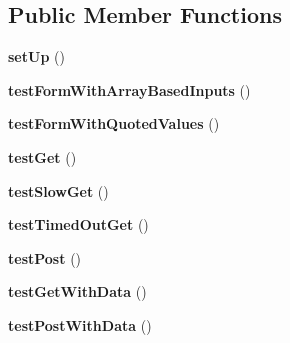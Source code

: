 \subsection*{Public Member Functions}
\begin{DoxyCompactItemize}
\item 
\hypertarget{class_test_of_live_fetching_aea37b08fe496529c1db03622c24cfdb4}{
{\bfseries setUp} ()}
\label{class_test_of_live_fetching_aea37b08fe496529c1db03622c24cfdb4}

\item 
\hypertarget{class_test_of_live_fetching_a76d58f8b72db161a13a95e858065fc12}{
{\bfseries testFormWithArrayBasedInputs} ()}
\label{class_test_of_live_fetching_a76d58f8b72db161a13a95e858065fc12}

\item 
\hypertarget{class_test_of_live_fetching_a29b94465603260d7ff08a0f5ea71df07}{
{\bfseries testFormWithQuotedValues} ()}
\label{class_test_of_live_fetching_a29b94465603260d7ff08a0f5ea71df07}

\item 
\hypertarget{class_test_of_live_fetching_a64c286cacc08fb3e195d8d36f9649076}{
{\bfseries testGet} ()}
\label{class_test_of_live_fetching_a64c286cacc08fb3e195d8d36f9649076}

\item 
\hypertarget{class_test_of_live_fetching_a7463d9bb60ec24f84ebe6e9c8b4810c6}{
{\bfseries testSlowGet} ()}
\label{class_test_of_live_fetching_a7463d9bb60ec24f84ebe6e9c8b4810c6}

\item 
\hypertarget{class_test_of_live_fetching_a30c1e1b6f6f504d4aea35b87a2093593}{
{\bfseries testTimedOutGet} ()}
\label{class_test_of_live_fetching_a30c1e1b6f6f504d4aea35b87a2093593}

\item 
\hypertarget{class_test_of_live_fetching_a813d607ce89a14f494105c0a53e3e580}{
{\bfseries testPost} ()}
\label{class_test_of_live_fetching_a813d607ce89a14f494105c0a53e3e580}

\item 
\hypertarget{class_test_of_live_fetching_a5518bfeeca35e41bfcfa984abff339f1}{
{\bfseries testGetWithData} ()}
\label{class_test_of_live_fetching_a5518bfeeca35e41bfcfa984abff339f1}

\item 
\hypertarget{class_test_of_live_fetching_a8f45f15ce72cd4ee941453c3621caec0}{
{\bfseries testPostWithData} ()}
\label{class_test_of_live_fetching_a8f45f15ce72cd4ee941453c3621caec0}


\end{DoxyCompactItemize}
